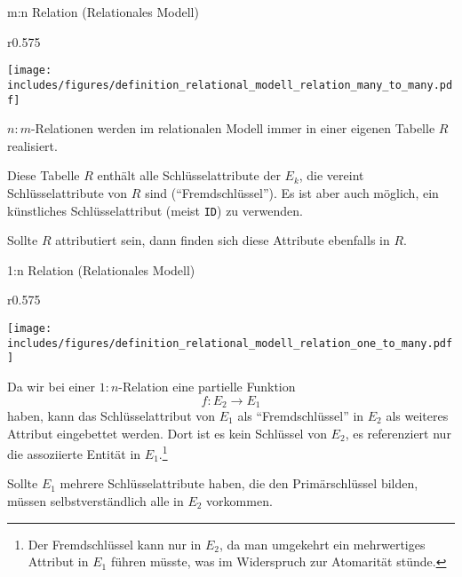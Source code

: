 \begin{defi}{m:n Relation (Relationales Modell)}
    \begin{wrapfigure}{r}{0.575\textwidth}
        \begin{center}
            \texttt{[image: includes/figures/definition\_relational\_modell\_relation\_many\_to\_many.pdf]}
        \end{center}
    \end{wrapfigure}
    $n:m$-Relationen werden im relationalen Modell immer in einer eigenen Tabelle $R$ realisiert.

    Diese Tabelle $R$ enthält alle Schlüsselattribute der $E_k$, die vereint Schlüsselattribute von $R$ sind (\enquote{Fremdschlüssel}).
    Es ist aber auch möglich, ein künstliches Schlüsselattribut (meist \texttt{ID}) zu verwenden.

    Sollte $R$ attributiert sein, dann finden sich diese Attribute ebenfalls in $R$.

    \vspace{6em}
\end{defi}

\begin{defi}{1:n Relation (Relationales Modell)}
    \begin{wrapfigure}{r}{0.575\textwidth}
        \begin{center}
            \texttt{[image: includes/figures/definition\_relational\_modell\_relation\_one\_to\_many.pdf]}
        \end{center}
    \end{wrapfigure}
    Da wir bei einer $1:n$-Relation eine partielle Funktion
    \[
        f: E_2 \to E_1
    \]
    haben, kann das Schlüsselattribut von $E_1$ als \enquote{Fremdschlüssel} in $E_2$ als weiteres Attribut eingebettet werden.
    Dort ist es kein Schlüssel von $E_2$, es referenziert nur die assoziierte Entität in $E_1$.\footnote{Der Fremdschlüssel kann nur in $E_2$, da man umgekehrt ein mehrwertiges Attribut in $E_1$ führen müsste, was im Widerspruch zur Atomarität stünde.}

    Sollte $E_1$ mehrere Schlüsselattribute haben, die den Primärschlüssel bilden, müssen selbstverständlich alle in $E_2$ vorkommen.
\end{defi}

